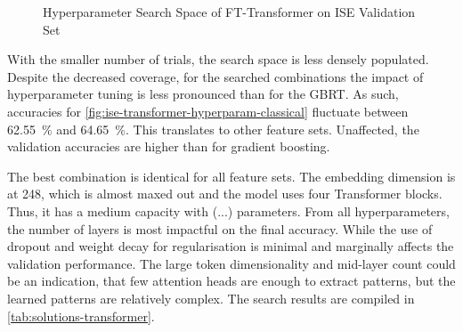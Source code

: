 \begin{figure}[!h]
    \vfill
\end{figure}
\clearpage
\begin{figure}[!ht]
    \addtocounter{figure}{-1}
    \caption[Hyperparameter Search Space of FT-Transformer on  Validation Set]{Hyperparameter Search Space of FT-Transformer on \gls{ISE} Validation Set}
    \label{fig:ise-transformer-hyperparam}
\end{figure}

With the smaller number of trials, the search space is less densely populated. Despite the decreased coverage, for the searched combinations the impact of hyperparameter tuning is less pronounced than for the \gls{GBRT}. As such, accuracies for \cref{fig:ise-transformer-hyperparam-classical} fluctuate between \SI{62.55}{\percent} and \SI{64.65}{\percent}. This translates to other feature sets. Unaffected, the validation accuracies are higher than for gradient boosting.


The best combination is identical for all feature sets. The embedding dimension is at \num{248}, which is almost maxed out and the model uses four Transformer blocks. Thus, it has a medium capacity with (...) parameters. From all hyperparameters, the number of layers is most impactful on the final accuracy.
While the use of dropout and weight decay for regularisation is minimal and marginally affects the validation performance. The large token dimensionality and mid-layer count could be an indication, that few attention heads are enough to extract patterns, but the learned patterns are relatively complex. The search results are compiled in \cref{tab:solutions-transformer}.


